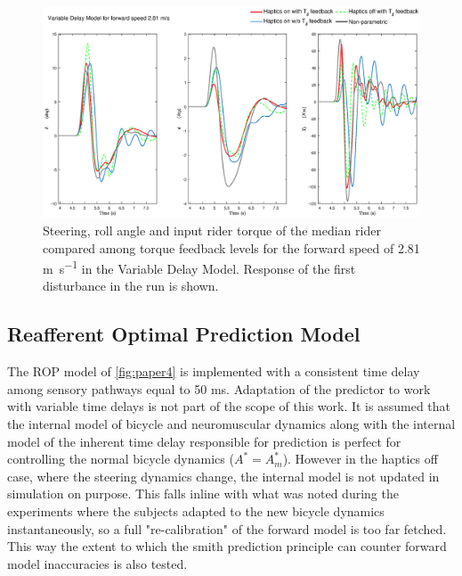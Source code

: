 \begin{figure}[!h]
    \centering
    \captionsetup{justification=centering,margin=2cm}

    \includegraphics[width=\textwidth]{images/fb_compare_plots/delay_fb_compare28.eps}
    \caption{Steering, roll angle and input rider torque of the median rider compared among torque feedback levels  for the forward speed of 2.81 \si{\meter\per\second} in the Variable Delay Model. Response of the first disturbance in the run is shown.}
    \label{fig:paper8}
\end{figure}


    \subsection{Reafferent Optimal Prediction  Model}

The ROP model of  \cref{fig:paper4} is implemented with a consistent time delay among sensory pathways equal to 50 \si{\milli\second}. Adaptation of the predictor to work with variable time delays is not part of the scope of this work. It is assumed that the internal model of bicycle and neuromuscular dynamics along with the internal model of the inherent time delay responsible for prediction is perfect for controlling the normal bicycle dynamics (\ensuremath{A^*=A_m^*}). However in the haptics off case, where the steering dynamics change, the internal model is not updated in simulation on purpose. This falls inline with what was noted during the experiments where the subjects adapted to the new bicycle dynamics instantaneously, so a full "re-calibration" of the forward model is too far fetched. This way the extent to which the smith prediction principle can counter forward model inaccuracies is also tested. 


